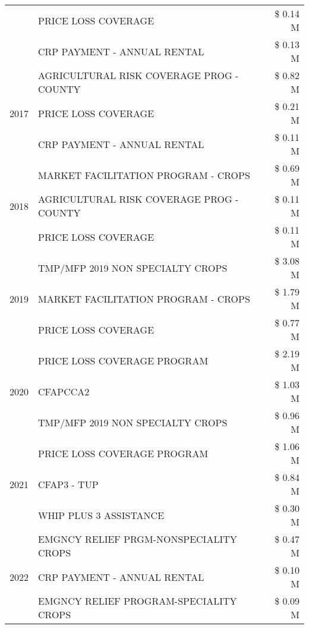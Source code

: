 \begin{tabular}{llr}
 & PRICE LOSS COVERAGE & \$ 0.14 M \\
 & CRP PAYMENT - ANNUAL RENTAL & \$ 0.13 M \\
\cline{1-3}
\multirow[t]{3}{*}{2017} & AGRICULTURAL RISK COVERAGE PROG - COUNTY & \$ 0.82 M \\
 & PRICE LOSS COVERAGE & \$ 0.21 M \\
 & CRP PAYMENT - ANNUAL RENTAL & \$ 0.11 M \\
\cline{1-3}
\multirow[t]{3}{*}{2018} & MARKET FACILITATION PROGRAM - CROPS & \$ 0.69 M \\
 & AGRICULTURAL RISK COVERAGE PROG - COUNTY & \$ 0.11 M \\
 & PRICE LOSS COVERAGE & \$ 0.11 M \\
\cline{1-3}
\multirow[t]{3}{*}{2019} & TMP/MFP 2019 NON SPECIALTY CROPS & \$ 3.08 M \\
 & MARKET FACILITATION PROGRAM - CROPS & \$ 1.79 M \\
 & PRICE LOSS COVERAGE & \$ 0.77 M \\
\cline{1-3}
\multirow[t]{3}{*}{2020} & PRICE LOSS COVERAGE PROGRAM & \$ 2.19 M \\
 & CFAPCCA2 & \$ 1.03 M \\
 & TMP/MFP 2019 NON SPECIALTY CROPS & \$ 0.96 M \\
\cline{1-3}
\multirow[t]{3}{*}{2021} & PRICE LOSS COVERAGE PROGRAM & \$ 1.06 M \\
 & CFAP3 - TUP & \$ 0.84 M \\
 & WHIP PLUS 3 ASSISTANCE & \$ 0.30 M \\
\cline{1-3}
\multirow[t]{3}{*}{2022} & EMGNCY RELIEF PRGM-NONSPECIALITY CROPS & \$ 0.47 M \\
 & CRP PAYMENT - ANNUAL RENTAL & \$ 0.10 M \\
 & EMGNCY RELIEF PROGRAM-SPECIALITY CROPS & \$ 0.09 M \\
\cline{1-3}
\bottomrule
\end{tabular}
